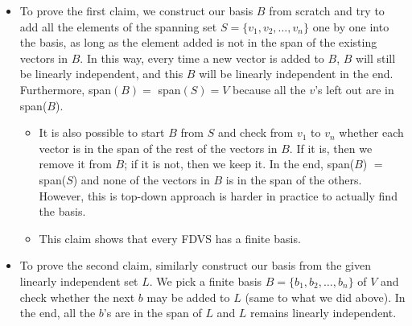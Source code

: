 \documentclass{article}
\begin{document}
\begin{itemize}
    \begin{itemize}
        \item To prove the first claim, we construct our basis $B$ from scratch and try to add all the elements of the spanning set $S = \{v_1, v_2, \dots, v_n\}$ one by one into the basis, as long as the element added is not in the span of the existing vectors in $B$. In this way, every time a new vector is added to $B$, $B$ will still be linearly independent, and this $B$ will be linearly independent in the end. Furthermore, span$(B) = $ span$(S) = V$ because all the $v$'s left out are in span($B$).
        \begin{itemize}
            \item It is also possible to start $B$ from $S$ and check from $v_1$ to $v_n$ whether each vector is in the span of the rest of the vectors in $B$. If it is, then we remove it from $B$; if it is not, then we keep it. In the end, span($B$) $=$ span($S$) and none of the vectors in $B$ is in the span of the others. However, this is top-down approach is harder in practice to actually find the basis.
            \item This claim shows that every FDVS has a finite basis.
        \end{itemize}
        \item To prove the second claim, similarly construct our basis from the given linearly independent set $L$. We pick a finite basis $B = \{b_1, b_2,\dots,b_n\}$ of $V$ and check whether the next $b$ may be added to $L$ (same to what we did above). In the end, all the $b$'s are in the span of $L$ and $L$ remains linearly independent.
    \end{itemize}
    

\end{itemize}
\end{document}
